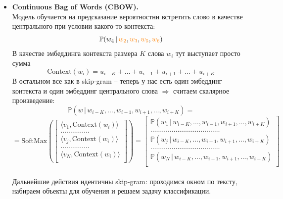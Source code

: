 \documentclass[12pt]{article}
\theoremstyle{definition} %
\theoremstyle{plain} %
\theoremstyle{remark} %
\begin{document}
\begin{itemize}
    \item \textbf{Continuous Bag of Words (CBOW).} \\
    
    Модель обучается на предсказание вероятностни встретить слово в качестве центрального при условии какого-то контекста:
    \[
    \mathbb{P}(w_4 \,|\, \textcolor{orange}{w_2}, \textcolor{orange}{w_3}, \textcolor{orange}{w_5}, \textcolor{orange}{w_6})
    \]
    В качестве эмбеддинга контекста размера $K$ слова $w_i$ тут выступает просто сумма
    \[
    \text{Context}(w_i) = u_{i - K} + \dots + u_{i - 1} + u_{i + 1} + \dots + u_{i + K}
    \]
    В остальном все как в skip-gram -- теперь у нас есть один эмбеддинг контекста и один эмбеддинг центрального слова $\Rightarrow$ считаем скалярное произведение:
    \[
    \mathbb{P}(w \,|\, w_{i - K}, \dots, w_{i - 1}, w_{i + 1}, \dots, w_{i + K}) = 
    \]
    \[
    =
    \text{SoftMax}
    \left(
    \begin{bmatrix}
        \langle v_1, \text{Context}(w_i) \rangle \\
        \dots \dots \dots \dots \dots \\
        \langle v_j, \text{Context}(w_i) \rangle \\
        \dots \dots \dots \dots \dots \\
        \langle v_N, \text{Context}(w_i) \rangle \\
    \end{bmatrix}
    \right)
    =
    \begin{bmatrix}
        \mathbb{P}(w_1 \,|\, w_{i - K}, \dots, w_{i - 1}, w_{i + 1}, \dots, w_{i + K}) \\
        \dots \dots \dots \dots \dots \dots \dots \dots \dots \dots \dots \dots \\
        \mathbb{P}(w_j \,|\, w_{i - K}, \dots, w_{i - 1}, w_{i + 1}, \dots, w_{i + K})  \\
        \dots \dots \dots \dots \dots \dots \dots \dots \dots \dots \dots \dots \\
        \mathbb{P}(w_N \,|\, w_{i - K}, \dots, w_{i - 1}, w_{i + 1}, \dots, w_{i + K})  \\
    \end{bmatrix}
    \] \\
    Дальнейшие действия идентичны skip-gram: проходимся окном по тексту, набираем объекты для обучения и решаем задачу классификации. \\
    
\end{itemize}
\end{document}
